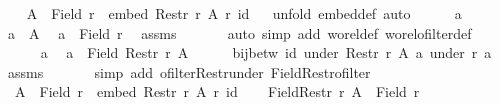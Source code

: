 \begin{isabellebody}
\ \ \isamarkupfalse%
\ {\isachardoublequoteopen}A\ {\isasymle}\ Field\ r\ {\isasymand}\ embed\ {\isacharparenleft}{\kern0pt}Restr\ r\ A{\isacharparenright}{\kern0pt}\ r\ id{\isachardoublequoteclose}\isanewline
\ \ \isamarkupfalse%
{\isacharparenleft}{\kern0pt}unfold\ embed{\isacharunderscore}{\kern0pt}def{\isacharcomma}{\kern0pt}\ auto{\isacharparenright}{\kern0pt}\isanewline
\ \ \ \ \isamarkupfalse%
\ a\ \isamarkupfalse%
\ {\isachardoublequoteopen}a\ {\isasymin}\ A{\isachardoublequoteclose}\ \isamarkupfalse%
\ {\isachardoublequoteopen}a\ {\isasymin}\ Field\ r{\isachardoublequoteclose}\ \isamarkupfalse%
\ assms\ {\isacharasterisk}{\kern0pt}\isanewline
\ \ \ \ \isamarkupfalse%
\ {\isacharparenleft}{\kern0pt}auto\ simp\ add{\isacharcolon}{\kern0pt}\ wo{\isacharunderscore}{\kern0pt}rel{\isacharunderscore}{\kern0pt}def\ wo{\isacharunderscore}{\kern0pt}rel{\isachardot}{\kern0pt}ofilter{\isacharunderscore}{\kern0pt}def{\isacharparenright}{\kern0pt}\isanewline
\ \ \isamarkupfalse%
\isanewline
\ \ \ \ \isamarkupfalse%
\ a\ \isamarkupfalse%
\ {\isachardoublequoteopen}a\ {\isasymin}\ Field\ {\isacharparenleft}{\kern0pt}Restr\ r\ A{\isacharparenright}{\kern0pt}{\isachardoublequoteclose}\isanewline
\ \ \ \ \isamarkupfalse%
\ {\isachardoublequoteopen}bij{\isacharunderscore}{\kern0pt}betw\ id\ {\isacharparenleft}{\kern0pt}under\ {\isacharparenleft}{\kern0pt}Restr\ r\ A{\isacharparenright}{\kern0pt}\ a{\isacharparenright}{\kern0pt}\ {\isacharparenleft}{\kern0pt}under\ r\ a{\isacharparenright}{\kern0pt}{\isachardoublequoteclose}\ \isamarkupfalse%
\ assms\ {\isacharasterisk}{\kern0pt}\isanewline
\ \ \ \ \isamarkupfalse%
\ {\isacharparenleft}{\kern0pt}simp\ add{\isacharcolon}{\kern0pt}\ ofilter{\isacharunderscore}{\kern0pt}Restr{\isacharunderscore}{\kern0pt}under\ Field{\isacharunderscore}{\kern0pt}Restr{\isacharunderscore}{\kern0pt}ofilter{\isacharparenright}{\kern0pt}\isanewline
\ \ \isamarkupfalse%
\isanewline
{}\isamarkupfalse%
\isanewline
\ \ \isamarkupfalse%
\ {\isacharasterisk}{\kern0pt}{\isacharcolon}{\kern0pt}\ {\isachardoublequoteopen}A\ {\isasymle}\ Field\ r\ {\isasymand}\ embed\ {\isacharparenleft}{\kern0pt}Restr\ r\ A{\isacharparenright}{\kern0pt}\ r\ id{\isachardoublequoteclose}\isanewline
\ \ \isamarkupfalse%
\ {\isachardoublequoteopen}Field{\isacharparenleft}{\kern0pt}Restr\ r\ A{\isacharparenright}{\kern0pt}\ {\isasymle}\ Field\ r{\isachardoublequoteclose}\isanewline

\end{isabellebody}

